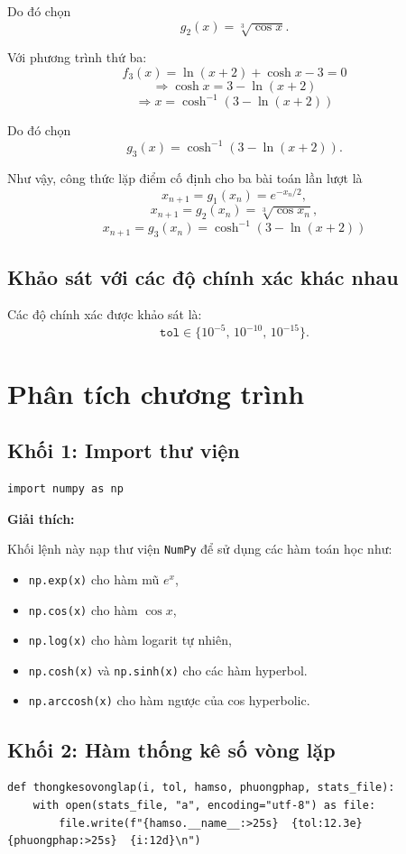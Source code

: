 \documentclass{article}
\begin{document}
Do đó chọn
\[
g_2(x)=\sqrt[3]{\cos x}.
\]

Với phương trình thứ ba:
\[
f_3(x)=\ln(x+2)+\cosh x-3=0
\]
\[
\Rightarrow \cosh x = 3-\ln(x+2)
\]
\[
\Rightarrow x=\cosh^{-1}(3-\ln(x+2))
\]

Do đó chọn
\[
g_3(x)=\cosh^{-1}(3-\ln(x+2)).
\]

Như vậy, công thức lặp điểm cố định cho ba bài toán lần lượt là
\[
x_{n+1}=g_1(x_n)=e^{-x_n/2},
\]
\[
x_{n+1}=g_2(x_n)=\sqrt[3]{\cos x_n},
\]
\[
x_{n+1}=g_3(x_n)=\cosh^{-1}(3-\ln(x+2))
\]
\subsection{Khảo sát với các độ chính xác khác nhau}
Các độ chính xác được khảo sát là:
\[
\mathtt{tol} \in \{10^{-5},\,10^{-10},\,10^{-15}\}.
\]

\newpage
\section{Phân tích chương trình}

\subsection{Khối 1: Import thư viện}
\begin{lstlisting}[style=mypython,caption={Import thư viện NumPy}]
import numpy as np
\end{lstlisting}

\textbf{Giải thích:}

Khối lệnh này nạp thư viện \texttt{NumPy} để sử dụng các hàm toán học như:
\begin{itemize}
    \item \texttt{np.exp(x)} cho hàm mũ \(e^x\),
    \item \texttt{np.cos(x)} cho hàm \(\cos x\),
    \item \texttt{np.log(x)} cho hàm logarit tự nhiên,
    \item \texttt{np.cosh(x)} và \texttt{np.sinh(x)} cho các hàm hyperbol.
    \item \texttt{np.arccosh(x)} cho hàm ngược của cos hyperbolic.
\end{itemize}

\subsection{Khối 2: Hàm thống kê số vòng lặp}
\begin{lstlisting}[style=mypython,caption={Hàm ghi thống kê số vòng lặp}]
def thongkesovonglap(i, tol, hamso, phuongphap, stats_file):
    with open(stats_file, "a", encoding="utf-8") as file:
        file.write(f"{hamso.__name__:>25s}  {tol:12.3e}  {phuongphap:>25s}  {i:12d}\n")
\end{lstlisting}
\end{document}

